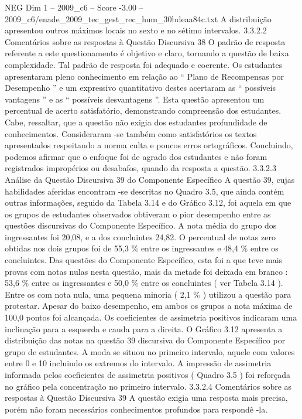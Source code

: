 \begin{textsample}{NEG Dim 1 – 2009\_c6 – Score -3.00 – 2009\_c6/enade\_2009\_tec\_gest\_rec\_hum\_30bdeaa84c.txt}
A distribuição apresentou outros máximos locais no sexto e no sétimo intervalos. 3.3.2.2 Comentários sobre as respostas à Questão Discursiva 38 O padrão de resposta referente a este questionamento é objetivo e claro, tornando a questão de baixa complexidade.
Tal padrão de resposta foi adequado e coerente.
Os estudantes apresentaram pleno conhecimento em relação ao “ Plano de Recompensas por Desempenho ” e um expressivo quantitativo destes acertaram as “ possíveis vantagens ” e as “ possíveis desvantagens ”.
Esta questão apresentou um percentual de acerto satisfatório, demonstrando compreensão dos estudantes.
Cabe, ressaltar, que a questão não exigia dos estudantes profundidade de conhecimentos.
Consideraram -se também como satisfatórios os textos apresentados respeitando a norma culta e poucos erros ortográficos.
Concluindo, podemos afirmar que o enfoque foi de agrado dos estudantes e não foram registrados impropérios ou desabafos, quando da resposta a questão. 3.3.2.3 Análise da Questão Discursiva 39 do Componente Específico A questão 39, cujas habilidades aferidas encontram -se descritas no Quadro 3.5, que ainda contém outras informações, seguido da Tabela 3.14 e do Gráfico 3.12, foi aquela em que os grupos de estudantes observados obtiveram o pior desempenho entre as questões discursivas do Componente Específico.
A nota média do grupo dos ingressantes foi 20,08, e a dos concluintes 24,82.
O percentual de notas zero obtidas nos dois grupos foi de 55,3 \% entre os ingressantes e 48,4 \% entre os concluintes.
Das questões do Componente Específico, esta foi a que teve mais provas com notas nulas nesta questão, mais da metade foi deixada em branco : 53,6 \% entre os ingressantes e 50,0 \% entre os concluintes ( ver Tabela 3.14 ).
Entre os com nota nula, uma pequena minoria ( 2,1 \% ) utilizou a questão para protestar.
Apesar do baixo desempenho, em ambos os grupos a nota máxima de 100,0 pontos foi alcançada.
Os coeficientes de assimetria positivos indicaram uma inclinação para a esquerda e cauda para a direita.
O Gráfico 3.12 apresenta a distribuição das notas na questão 39 discursiva do Componente Específico por grupo de estudantes.
A moda se situou no primeiro intervalo, aquele com valores entre 0 e 10 incluindo os extremos do intervalo.
A impressão de assimetria informada pelos coeficientes de assimetria positivos ( Quadro 3.5 ) foi reforçada no gráfico pela concentração no primeiro intervalo. 3.3.2.4 Comentários sobre as respostas à Questão Discursiva 39 A questão exigia uma resposta mais precisa, porém não foram necessários conhecimentos profundos para respondê -la.

\end{textsample}
